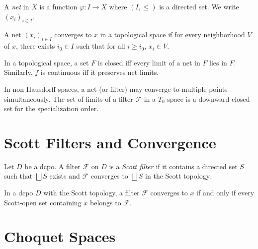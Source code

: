 \begin{definition}[Net]
A \emph{net} in $X$ is a function $\varphi\colon I \to X$ where $(I, \leq)$ is a directed
set. We write $(x_i)_{i\in I}$.
\end{definition}

\begin{definition}
A net $(x_i)_{i\in I}$ converges to $x$ in a topological space if for every neighborhood
$V$ of $x$, there exists $i_0 \in I$ such that for all $i \geq i_0$, $x_i \in V$.
\end{definition}

\begin{theorem}
In a topological space, a set $F$ is closed iff every limit of a net in $F$ lies in $F$.
Similarly, $f$ is continuous iff it preserves net limits.
\end{theorem}

\begin{warning}
In non-Hausdorff spaces, a net (or filter) may converge to multiple points simultaneously.
The set of limits of a filter $\mathcal{F}$ in a $T_0$-space is a downward-closed set for
the specialization order.
\end{warning}

\section{Scott Filters and Convergence}

\begin{definition}
Let $D$ be a dcpo. A filter $\mathcal{F}$ on $D$ is a \emph{Scott filter} if it contains a
directed set $S$ such that $\bigsqcup S$ exists and $\mathcal{F}$ converges to
$\bigsqcup S$ in the Scott topology.
\end{definition}

\begin{proposition}
In a dcpo $D$ with the Scott topology, a filter $\mathcal{F}$ converges to $x$ if and only
if every Scott-open set containing $x$ belongs to $\mathcal{F}$.
\end{proposition}

\section{Choquet Spaces}

